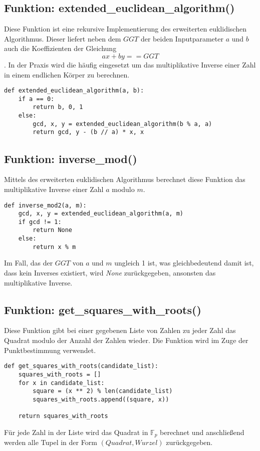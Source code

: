 \subsection{Funktion: extended\_euclidean\_algorithm()}
Diese Funktion ist eine rekursive Implementierung des erweiterten euklidischen Algorithmus. Dieser liefert neben dem $GGT$ der beiden Inputparameter $a$ und $b$ auch die Koeffizienten der Gleichung $$ax + by == GGT$$. In der Praxis wird die häufig eingesetzt um das multiplikative Inverse einer Zahl in einem endlichen Körper zu berechnen.
\vspace{\baselineskip}
\begin{lstlisting}[caption={Funktion: extended\_euclidean\_algorithm()}, captionpos=b]
def extended_euclidean_algorithm(a, b):
    if a == 0:
        return b, 0, 1
    else:
        gcd, x, y = extended_euclidean_algorithm(b % a, a)
        return gcd, y - (b // a) * x, x
\end{lstlisting}
\vspace{\baselineskip}

\subsection{Funktion: inverse\_mod()}
Mittels des erweiterten euklidischen Algorithmus berechnet diese Funktion das multiplikative Inverse einer Zahl $a$ modulo $m$.

\vspace{\baselineskip}
\begin{lstlisting}[caption={Funktion: inverse\_mod()}, captionpos=b]
def inverse_mod2(a, m):
    gcd, x, y = extended_euclidean_algorithm(a, m)
    if gcd != 1:
        return None
    else:
        return x % m
\end{lstlisting}
\vspace{\baselineskip}

Im Fall, das der $GGT$ von $a$ und $m$ ungleich 1 ist, was gleichbedeutend damit ist, dass kein Inverses existiert, wird \textit{None} zurückgegeben, ansonsten das  multiplikative Inverse.

\subsection{Funktion: get\_squares\_with\_roots()}
Diese Funktion gibt bei einer gegebenen Liste von Zahlen zu jeder Zahl das Quadrat modulo der Anzahl der Zahlen wieder. Die Funktion wird im Zuge der Punktbestimmung verwendet.
\vspace{\baselineskip}
\begin{lstlisting}[caption={Funktion: get\_squares\_with\_roots()}, captionpos=b]
def get_squares_with_roots(candidate_list):
    squares_with_roots = []
    for x in candidate_list:
        square = (x ** 2) % len(candidate_list)
        squares_with_roots.append((square, x))

    return squares_with_roots
\end{lstlisting}
\vspace{\baselineskip}
Für jede Zahl in der Liste wird das Quadrat in $\mathbb{F}_p$ berechnet und anschließend werden alle Tupel in der Form $(Quadrat, Wurzel)$ zurückgegeben.
